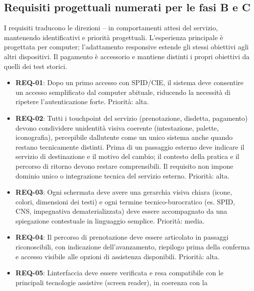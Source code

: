 \subsection[Requisiti per il redesign]{Requisiti progettuali numerati per le fasi B e C}

I requisiti traducono le direzioni -- in comportamenti attesi del
servizio, mantenendo identificativi e priorità progettuali. L'esperienza
principale è progettata per computer; l'adattamento responsive estende
gli stessi obiettivi agli altri dispositivi. Il pagamento è accessorio e
mantiene distinti i propri obiettivi da quelli dei test storici.

\begin{itemize}
\item
  \hypertarget{req:REQ-01}{}\textbf{REQ-01}: Dopo un primo accesso con
  SPID/CIE, il sistema deve consentire un accesso semplificato dal computer
  abituale, riducendo la necessità di ripetere l'autenticazione forte.
  Priorità: alta.
\item
  \hypertarget{req:REQ-02}{}\textbf{REQ-02}: Tutti i touchpoint del
  servizio (prenotazione, disdetta, pagamento) devono condividere
  un\textquotesingle identità visiva coerente (intestazione, palette,
  iconografia), percepibile dall\textquotesingle utente come un unico
  sistema anche quando restano tecnicamente distinti. Prima di un passaggio
  esterno deve indicare il servizio di destinazione e il motivo del cambio;
  il contesto della pratica e il percorso di ritorno devono restare
  comprensibili. Il requisito non impone dominio unico o integrazione
  tecnica del servizio esterno. Priorità: alta.
\item
  \hypertarget{req:REQ-03}{}\textbf{REQ-03}: Ogni schermata
  deve avere una gerarchia visiva chiara (icone, colori, dimensioni dei
  testi) e ogni termine tecnico-burocratico (es. SPID, CNS, impegnativa
  dematerializzata) deve essere accompagnato da una spiegazione
  contestuale in linguaggio semplice. Priorità: media.
\item
  \hypertarget{req:REQ-04}{}\textbf{REQ-04}: Il percorso di prenotazione deve
  essere articolato in passaggi riconoscibili, con indicazione
  dell'avanzamento, riepilogo prima della conferma e accesso visibile alle
  opzioni di assistenza disponibili. Priorità: alta.
\item
  \hypertarget{req:REQ-05}{}\textbf{REQ-05}: L\textquotesingle interfaccia
  deve essere verificata e resa compatibile con le principali
  tecnologie assistive (screen reader), in coerenza con la

\end{itemize}
